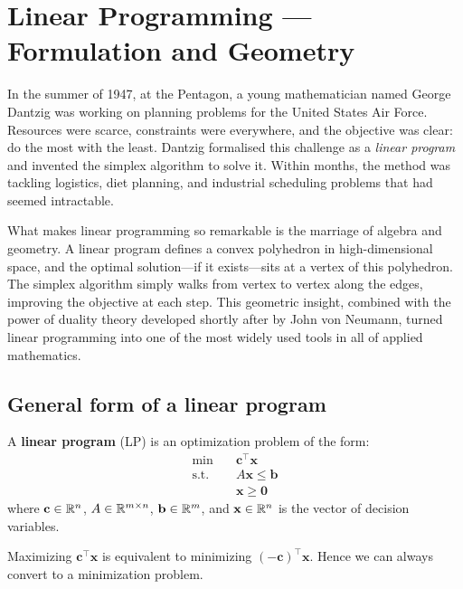 \chapter{Linear Programming --- Formulation and Geometry}
\label{ch:linear_programming}

In the summer of 1947, at the Pentagon, a young mathematician named George Dantzig was working on planning problems for the United States Air Force. Resources were scarce, constraints were everywhere, and the objective was clear: do the most with the least. Dantzig formalised this challenge as a \emph{linear program} and invented the simplex algorithm to solve it. Within months, the method was tackling logistics, diet planning, and industrial scheduling problems that had seemed intractable.

What makes linear programming so remarkable is the marriage of algebra and geometry. A linear program defines a convex polyhedron in high-dimensional space, and the optimal solution---if it exists---sits at a vertex of this polyhedron. The simplex algorithm simply walks from vertex to vertex along the edges, improving the objective at each step. This geometric insight, combined with the power of duality theory developed shortly after by John von Neumann, turned linear programming into one of the most widely used tools in all of applied mathematics.

\section{General form of a linear program}

\begin{definition}
A \textbf{linear program} (LP) is an optimization problem of the form:
\[
\begin{aligned}
  \min \quad & \mathbf{c}^\top \mathbf{x} \\
  \text{s.t.} \quad
    & A\mathbf{x} \le \mathbf{b} \\
    & \mathbf{x} \ge \mathbf{0}
\end{aligned}
\]
where $\mathbf{c} \in \mathbb{R}^n$, $A \in \mathbb{R}^{m \times n}$, $\mathbf{b} \in \mathbb{R}^m$,
and $\mathbf{x} \in \mathbb{R}^n$ is the vector of decision variables.
\end{definition}

\begin{remark}
Maximizing $\mathbf{c}^\top \mathbf{x}$ is equivalent to minimizing
$(-\mathbf{c})^\top \mathbf{x}$.  Hence we can always convert to a
minimization problem.
\end{remark}

